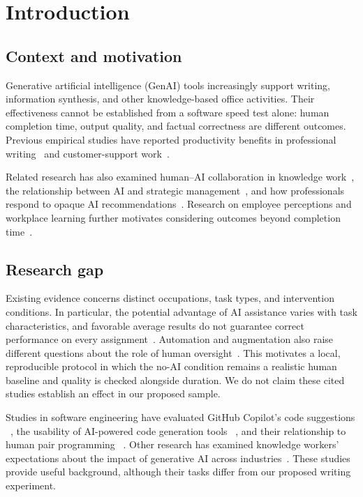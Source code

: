 \section{Introduction}\label{sec:introduction}
\subsection{Context and motivation}
Generative artificial intelligence (GenAI) tools increasingly support writing, information synthesis, and other knowledge-based office activities. Their effectiveness cannot be established from a software speed test alone: human completion time, output quality, and factual correctness are different outcomes. Previous empirical studies have reported productivity benefits in professional writing~\cite{noyExperimentalEvidenceProductivity2023} and customer-support work~\cite{brynjolfssonGenerativeAIWork2023}.

Related research has also examined human--AI collaboration
in knowledge work~\cite{sowaCobotsKnowledgeWork2021},
the relationship between AI and strategic
management~\cite{kedingUnderstandingInterplayArtificial2021},
and how professionals respond to opaque AI
recommendations~\cite{lebovitzEngageNotEngage2022}.
Research on employee perceptions and workplace
learning further motivates considering outcomes
beyond completion time~\cite{callariCanGenerativeArtificial2025a}.

\subsection{Research gap}
Existing evidence concerns distinct occupations, task types, and intervention conditions. In particular, the potential advantage of AI assistance varies with task characteristics, and favorable average results do not guarantee correct performance on every assignment~\cite{dellacquaNavigatingJaggedTechnological2026}. Automation and augmentation also raise different questions about the role of human oversight~\cite{raischArtificialIntelligenceManagement2021}. This motivates a local, reproducible protocol in which the no-AI condition remains a realistic human baseline and quality is checked alongside duration. We do not claim these cited studies establish an effect in our proposed sample.

Studies in software engineering have evaluated
GitHub Copilot's code suggestions
~\cite{nguyenEmpiricalEvaluationGitHub2022},
the usability of AI-powered code generation tools
~\cite{vaithilingamExpectationVsExperience2022},
and their relationship to human pair programming
~\cite{imaiGitHubCopilotSubstitute2022}.
Other research has examined knowledge workers'
expectations about the impact of generative AI
across industries~\cite{woodruffHowKnowledgeWorkers2024}.
These studies provide useful background, although
their tasks differ from our proposed writing experiment.

